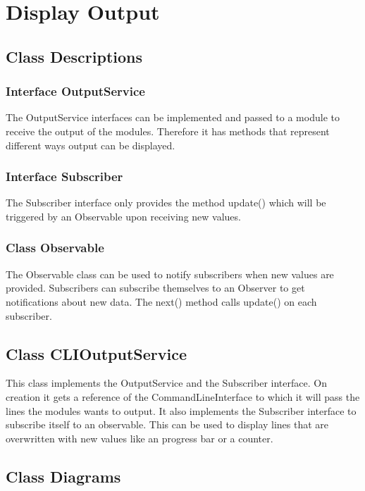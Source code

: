 \documentclass[parskip=full]{scrartcl}
\begin{document}
\newpage

\section{Display Output}

\subsection{Class Descriptions}

\subsubsection{Interface OutputService}
The OutputService interfaces can be implemented and passed to a module to receive the output of the modules. 
Therefore it has methods that represent different ways output can be displayed. 

 \subsubsection{Interface Subscriber}
The Subscriber interface only provides the method update() which will be triggered by an Observable upon receiving new values.

\subsubsection{Class Observable} 
The Observable class can be used to notify subscribers when new values are provided.
Subscribers can subscribe themselves to an Observer to get notifications about new data.
The next() method calls update() on each subscriber.

\subsection{Class CLIOutputService}
This class implements the OutputService and the Subscriber interface. 
On creation it gets a reference of the CommandLineInterface to which it will pass the lines the modules wants to output.
It also implements the Subscriber interface to subscribe itself to an observable.
This can be used to display lines that are overwritten with new values like an progress bar or a counter.

\newpage

\subsection{Class Diagrams}
\end{document}
